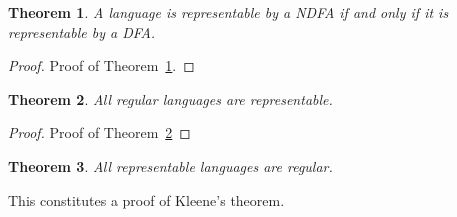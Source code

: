 \documentclass[12 pt, twoside, letterpaper]{article}
\newcommand{\refthm}[1]{Theorem~\ref{#1}}
\theoremstyle{definition}
\theoremstyle{plain}
\newtheorem{theorem}{Theorem}
\begin{document}
	\begin{theorem}
	\label{thm:ndfa_dfa_equivalent}
		A language is representable by a NDFA if and only if it is representable by a DFA.
	\end{theorem}

	\begin{proof}
	\label{proof:ndfa_dfa_equivalent}
		Proof of \refthm{thm:ndfa_dfa_equivalent}.
	\end{proof}

	\begin{theorem}
	\label{thm:regular_languages_representable}
		All regular languages are representable.
	\end{theorem}

	\begin{proof}
		Proof of \refthm{thm:regular_languages_representable}
	\end{proof}

	\begin{theorem}
	\label{thm:representable_languages_regular}
		All representable languages are regular.
	\end{theorem}

	This constitutes a proof of Kleene's theorem.






\end{document}

